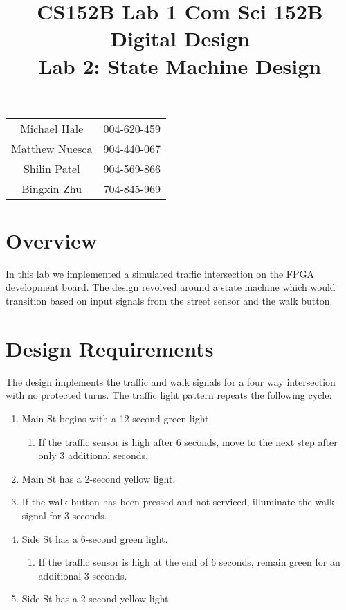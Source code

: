 \documentclass[11pt]{article}
\title{CS152B Lab 1}
\begin{document}
	
\title{\vspace{-0.5in} Com Sci 152B Digital Design \\
	Lab 2: State Machine Design }
\date{}
\maketitle
\vspace{-0.75in}
\begin{center}
	\begin{tabular}{cc}
		Michael Hale & 004-620-459 \\ 
		Matthew Nuesca & 904-440-067 \\ 
		Shilin Patel & 904-569-866 \\ 
		Bingxin Zhu & 704-845-969
	\end{tabular}
\end{center}

\section{Overview}
In this lab we implemented a simulated traffic intersection on the FPGA development board. The design revolved around a state machine which would transition based on input signals from the street sensor and the walk button. 

\section{Design Requirements}
The design implements the traffic and walk signals for a four way intersection with no protected turns. The traffic light pattern repeats the following cycle:
\begin{enumerate}
	\item Main St begins with a 12-second green light.
	\begin{enumerate}
		\item If the traffic sensor is high after 6 seconds, move to the next step after only 3 additional seconds.
	\end{enumerate}
	\item Main St has a 2-second yellow light.
	\item If the walk button has been pressed and not serviced, illuminate the walk signal for 3 seconds.
	\item Side St has a 6-second green light.
	\begin{enumerate}
		\item If the traffic sensor is high at the end of 6 seconds, remain green for an additional 3 seconds.
	\end{enumerate}
	\item Side St has a 2-second yellow light.
\end{enumerate} 
\end{document}
